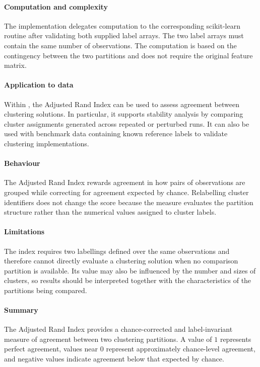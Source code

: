 \paragraph{Computation and complexity}
\label{sec:measure:adjusted_rand:complexity}

The implementation delegates computation to the corresponding scikit-learn routine after validating both supplied label arrays. The two label arrays must contain the same number of observations. The computation is based on the contingency between the two partitions and does not require the original feature matrix.

\paragraph{Application to \projectname{} data}
\label{sec:measure:adjusted_rand:application}

Within \projectname{}, the Adjusted Rand Index can be used to assess agreement between clustering solutions. In particular, it supports stability analysis by comparing cluster assignments generated across repeated or perturbed runs. It can also be used with benchmark data containing known reference labels to validate clustering implementations.

\paragraph{Behaviour}
\label{sec:measure:adjusted_rand:behaviour}

The Adjusted Rand Index rewards agreement in how pairs of observations are grouped while correcting for agreement expected by chance. Relabelling cluster identifiers does not change the score because the measure evaluates the partition structure rather than the numerical values assigned to cluster labels.

\paragraph{Limitations}
\label{sec:measure:adjusted_rand:limitations}

The index requires two labellings defined over the same observations and therefore cannot directly evaluate a clustering solution when no comparison partition is available. Its value may also be influenced by the number and sizes of clusters, so results should be interpreted together with the characteristics of the partitions being compared.

\paragraph{Summary}
\label{sec:measure:adjusted_rand:summary}

The Adjusted Rand Index provides a chance-corrected and label-invariant measure of agreement between two clustering partitions. A value of \(1\) represents perfect agreement, values near \(0\) represent approximately chance-level agreement, and negative values indicate agreement below that expected by chance.

